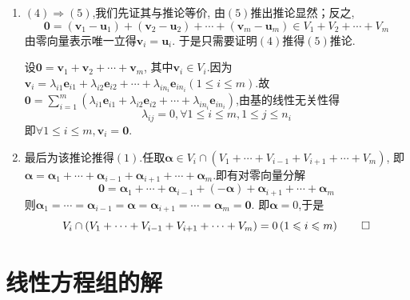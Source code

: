 \begin{formal}
\begin{Proof}
\begin{enumerate}[label=\textup{(\Roman*)}]
$\forall \bm{\alpha}=\bm{\alpha}_1+\cdots+\bm{\alpha}_m\in V_0=
V_1+\cdots+V_m$,其中$\bm{\alpha}_i\in V_i.$
设$\bm{\alpha}_i=
\lambda_{i1}\bm{e}_{i1}+\lambda_{i2}\bm{e}_{i2}+\cdots+\lambda_{in_i}
\bm{e}_{in_i}\left(1\leqslant i \leqslant m\right)$.容易证明线性组合,
以此判定基.

\item $(4)\Longrightarrow (5)$,我们先证其与推论等价,
 由$(5)$推出推论显然；反之,
 \[
 \bm{0}=\left(\bm{v}_1-\bm{u}_1\right)+\left(
    \bm{v}_2-\bm{u}_2
 \right)+\cdots+\left(\bm{v}_m-\bm{u}_m\right)\in V_1+V_2+\cdots+V_m
 \]
 由零向量表示唯一立得$\bm{v}_i=\bm{u}_i.$
 于是只需要证明$(4)$推得$(5)$推论.

设$\bm{0}=\bm{v}_1+\bm{v}_2+\cdots+\bm{v}_m$,
其中$\bm{v}_i\in V_i.$因为
$\bm{v}_i=
\lambda_{i1}\bm{e}_{i1}+\lambda_{i2}\bm{e}_{i2}+\cdots+\lambda_{in_i}
\bm{e}_{in_i}\left(
    1\leqslant i\leqslant m
\right)$.故
$\displaystyle
\bm{0}=\sum_{i=1}^{m}\left(
    \lambda_{i1}\bm{e}_{i1}+\lambda_{i2}\bm{e}_{i2}+\cdots+\lambda_{in_i}
\bm{e}_{in_i}
\right)$,由基的线性无关性得
\[
\lambda_{ij}=0,\forall 1\leqslant i\leqslant m,1\leqslant j\leqslant n_i
\]
即$\forall 1\leqslant i\leqslant m,\bm{v}_i=\bm{0}$.

\item 最后为该推论推得$(1)$.任取$
\bm{\alpha}\in V_i\cap \left(V_1+\cdots+V_{i-1}+V_{i+1}+\cdots+
V_m\right)$,
即$\bm{\alpha}=\bm{\alpha}_1+\cdots+\bm{\alpha}_{i-1}+\bm{\alpha}_{i+1}+\cdots+\bm{\alpha}_m
$.即有对零向量分解
\[
\bm{0}=\bm{\alpha}_1+\cdots
+\bm{\alpha}_{i-1}+\left(-\bm{\alpha}
\right)+\bm{\alpha}_{i+1}+\cdots+\bm{\alpha}_m
\]
则$\bm{\alpha}_1=\cdots=\bm{\alpha}_{i-1}=\bm{\alpha}=
\bm{\alpha}_{i+1}=\cdots=\bm{\alpha}_m=\bm{0}.$
即$\bm{\alpha}=0$,于是
\[
V_i\cap \left(V_1+\cdots+V_{i-1}+V_{i+1}+\cdots+
V_m\right)=0\left(1\leqslant i\leqslant 
m\right)
\qedhere
\]
\end{enumerate}
\end{Proof}
\end{formal}
\newpage
\section{线性方程组的解}
